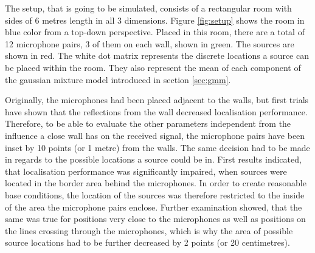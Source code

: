 %	

The setup, that is going to be simulated, consists of a rectangular room with sides of 6 metres length in all 3 dimensions. Figure \ref{fig:setup} shows the room in blue color from a top-down perspective. Placed in this room, there are a total of 12 microphone pairs, 3 of them on each wall, shown in green. The sources are shown in red. The white dot matrix represents the discrete locations a source can be placed within the room. They also represent the mean of each component of the gaussian mixture model introduced in section \ref{sec:gmm}.

Originally, the microphones had been placed adjacent to the walls, but first trials have shown that the reflections from the wall decreased localisation performance. Therefore, to be able to evaluate the other parameters independent from the influence a close wall has on the received signal, the microphone pairs have been inset by 10 points (or 1 metre) from the walls. The same decision had to be made in regards to the possible locations a source could be in. First results indicated, that localisation performance was significantly impaired, when sources were located in the border area behind the microphones. In order to create reasonable base conditions, the location of the sources was therefore restricted to the inside of the area the microphone pairs enclose. Further examination showed, that the same was true for positions very close to the microphones as well as positions on the lines crossing through the microphones, which is why the area of possible source locations had to be further decreased by 2 points (or 20 centimetres).

